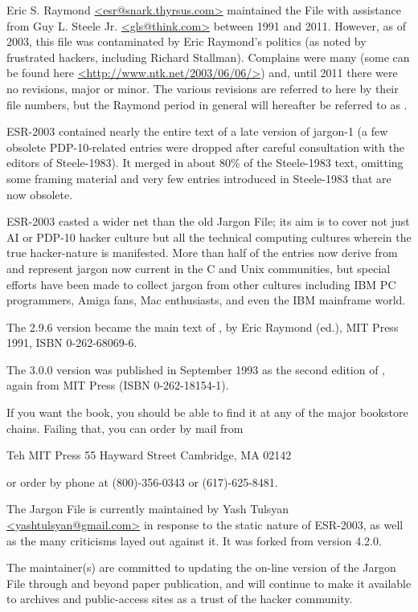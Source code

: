 Eric S. Raymond \url{<esr@snark.thyrsus.com>} maintained the File with assistance from Guy L. Steele Jr. \url{<gls@think.com>} between
1991 and 2011. However, as of 2003, this file was contaminated by Eric Raymond's politics (as noted by frustrated hackers, including
Richard Stallman). Complains were many (some can be found here \url{<http://www.ntk.net/2003/06/06/>}) and, until 2011 there were no
revisions, major or minor. The various revisions are referred to here by their file numbers, but the Raymond period in general will
hereafter be referred to as .

ESR-2003 contained nearly the entire text of a late version of jargon-1 (a few obsolete PDP-10-related entries were dropped after
careful consultation with the editors of Steele-1983). It merged in about 80\% of the Steele-1983 text, omitting some framing material and
very few entries introduced in Steele-1983 that are now obsolete.

ESR-2003 casted a wider net than the old Jargon File; its aim is to cover not just AI or PDP-10 hacker culture but all the technical
computing cultures wherein the true hacker-nature is manifested. More than half of the entries now derive from  and
represent jargon now current in the C and Unix communities, but special efforts have been made to collect jargon from other cultures
including IBM PC programmers, Amiga fans, Mac enthusiasts, and even the IBM mainframe world.

The 2.9.6 version became the main text of , by Eric Raymond (ed.), MIT Press 1991, ISBN
0-262-68069-6.

The 3.0.0 version was published in September 1993 as the second edition of , again from MIT Press
(ISBN 0-262-18154-1).

If you want the book, you should be able to find it at any of the major bookstore chains. Failing that, you can order by mail from

Teh MIT Press 55 Hayward Street Cambridge, MA 02142

or order by phone at (800)-356-0343 or (617)-625-8481.

The Jargon File is currently maintained by Yash Tulsyan \url{<yashtulsyan@gmail.com>} in response to the static nature of ESR-2003, as well
as the many criticisms layed out against it. It was forked from version 4.2.0.

The maintainer(s) are committed to updating the on-line version of the Jargon File through and beyond paper publication, and will continue
to make it available to archives and public-access sites as a trust of the hacker community.

